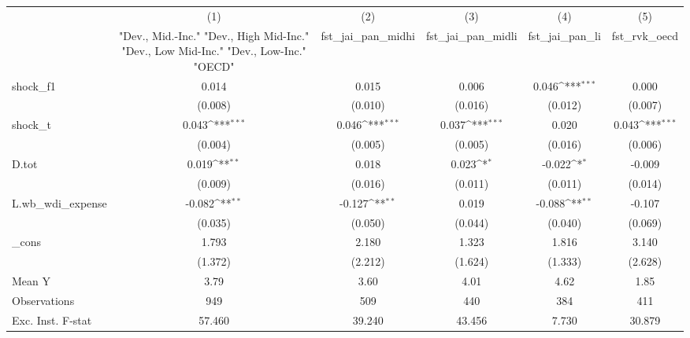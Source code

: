{
\def\sym#1{\ifmmode^{#1}\else\(^{#1}\)\fi}
\begin{tabular}{l*{5}{c}}
\toprule
            &\multicolumn{1}{c}{(1)}&\multicolumn{1}{c}{(2)}&\multicolumn{1}{c}{(3)}&\multicolumn{1}{c}{(4)}&\multicolumn{1}{c}{(5)}\\
            &\multicolumn{1}{c}{ "Dev., Mid.-Inc." "Dev., High Mid-Inc." "Dev., Low Mid-Inc." "Dev., Low-Inc." "OECD" }&\multicolumn{1}{c}{fst\_jai\_pan\_midhi}&\multicolumn{1}{c}{fst\_jai\_pan\_midli}&\multicolumn{1}{c}{fst\_jai\_pan\_li}&\multicolumn{1}{c}{fst\_rvk\_oecd}\\
\midrule
shock\_f1    &       0.014         &       0.015         &       0.006         &       0.046\sym{***}&       0.000         \\
            &     (0.008)         &     (0.010)         &     (0.016)         &     (0.012)         &     (0.007)         \\
\addlinespace
shock\_t     &       0.043\sym{***}&       0.046\sym{***}&       0.037\sym{***}&       0.020         &       0.043\sym{***}\\
            &     (0.004)         &     (0.005)         &     (0.005)         &     (0.016)         &     (0.006)         \\
\addlinespace
D.tot       &       0.019\sym{**} &       0.018         &       0.023\sym{*}  &      -0.022\sym{*}  &      -0.009         \\
            &     (0.009)         &     (0.016)         &     (0.011)         &     (0.011)         &     (0.014)         \\
\addlinespace
L.wb\_wdi\_expense&      -0.082\sym{**} &      -0.127\sym{**} &       0.019         &      -0.088\sym{**} &      -0.107         \\
            &     (0.035)         &     (0.050)         &     (0.044)         &     (0.040)         &     (0.069)         \\
\addlinespace
\_cons      &       1.793         &       2.180         &       1.323         &       1.816         &       3.140         \\
            &     (1.372)         &     (2.212)         &     (1.624)         &     (1.333)         &     (2.628)         \\
\midrule
Mean Y      &        3.79         &        3.60         &        4.01         &        4.62         &        1.85         \\
Observations&         949         &         509         &         440         &         384         &         411         \\
Exc. Inst. F-stat&      57.460         &      39.240         &      43.456         &       7.730         &      30.879         \\
\bottomrule
\end{tabular}
}
